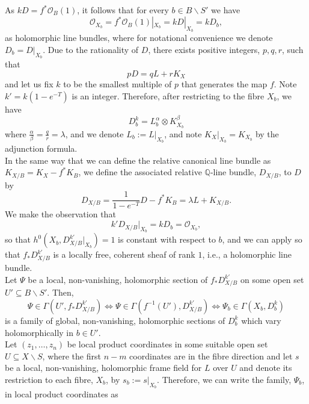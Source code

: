 \documentclass[12pt]{article}
\numberwithin{equation}{section}
\newcommand{\Q}{\mathbb{Q}}
\newcommand{\OO}{\mathcal{O}}
\begin{document}
As $kD = f^* \OO_B(1)$, it follows that for every $b \in B\backslash S'$ we have
\begin{equation*}
    \OO_{X_b} = f^*\OO_B(1)|_{X_b} = kD|_{X_b} = kD_b,
\end{equation*}
as holomorphic line bundles, where for notational convenience we denote $D_b = D|_{X_b}$. Due to the rationality of $D$, there exists positive integers, $p,q,r$, such that
\begin{equation*}
    pD = qL + rK_X
\end{equation*}
and let us fix $k$ to be the smallest multiple of $p$ that generates the map $f$. Note $k' = k(1-e^{-T})$ is an integer. Therefore, after restricting to the fibre $X_b$, we have
\begin{equation*}
    D_b^k = L_b^\alpha \otimes K_{X_b}^\beta
\end{equation*}
where $\frac{\alpha}{\beta} = \frac{q}{r} = \lambda$, and we denote $L_b := L|_{X_b}$, and note $K_X|_{X_b} = K_{X_b}$ by the adjunction formula.\\
In the same way that we can define the relative canonical line bundle as $K_{X/B} = K_X - f^* K_B$, we define the associated relative $\Q$-line bundle, $D_{X/B}$, to $D$ by
\begin{equation}\label{associated_relative_bundle}
    D_{X/B} = \frac{1}{1-e^{-T}}D - f^* K_B = \lambda L +  K_{X/B}.
\end{equation}
We make the observation that
\begin{equation*}
k'D_{X/B}|_{X_b} = kD_b = \OO_{X_b},
\end{equation*}
so that $h^0(X_b, D_{X/B}^{k'}|_{X_b}) = 1$ is constant with respect to $b$, and we can apply \cite[Thm I.8.5.iii]{BHPV04} so that $f_* D_{X/B}^{k'}$ is a locally free, coherent sheaf of rank $1$, i.e., a holomorphic line bundle.\\
Let $\Psi$ be a local, non-vanishing, holomorphic section of $f_* D^{k'}_{X/B}$ on some open set $U' \subseteq B\backslash S'$. Then,
\begin{equation*}
    \Psi \in \Gamma(U', f_* D_{X/B}^{k'}) \iff \Psi \in \Gamma(f^{-1}(U'), D^{k'}_{X/B})
    \iff \Psi_b \in \Gamma(X_b, D_b^k)
\end{equation*}
is a family of global, non-vanishing, holomorphic sections of $D^k_b$ which vary holomorphically in $b \in U'$.\\
Let $(z_1,\dots,z_n)$ be local product coordinates in some suitable open set $U \subseteq X\backslash S$, where the first $n-m$ coordinates are in the fibre direction and let $s$ be a local, non-vanishing, holomorphic frame field for $L$ over $U$ and denote its restriction to each fibre, $X_b$, by $s_b := s|_{X_b}$. Therefore, we can write the family, $\Psi_b$, in local product coordinates as
\end{document}
